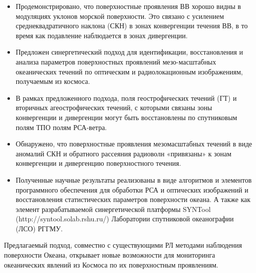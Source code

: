 \begin{itemize}
\item Продемонстрировано, что поверхностные проявления ВВ хорошо видны в модуляциях уклонов морской поверхности. Это связано с усилением среднеквадратичного наклона (СКН) в зонах конвергенции течения ВВ, в то время как подавление наблюдается в зонах дивергенции.

\item Предложен синергетический подход для идентификации, восстановления и анализа параметров поверхностных проявлений мезо-масштабных океанических течений по оптическим и радиолокационным изображениям, получаемым из космоса.

\item В рамках предложенного подхода, поля геострофических течений (ГТ) и вторичных агеострофических течений, с которыми связаны зоны конвергенции и дивергенции могут быть восстановлены по спутниковым полям ТПО полям РСА-ветра. 

\item Обнаружено, что поверхностные проявления мезомасштабных течений в виде аномалий СКН и обратного рассеяния радиоволн «привязаны» к зонам конвергенции и дивергенцию поверхностного течения.

\item Полученные научные результаты реализованы в виде алгоритмов и элементов программного обеспечения для обработки РСА и оптических изображений и восстановления статистических параметров поверхности океана. А также как элемент разрабатываемой синергетической платформы SYNTool (http://syntool.solab.rshu.ru/) Лаборатории спутниковой океанографии (ЛСО) РГГМУ.

\end{itemize}

Предлагаемый подход, совместно с существующими РЛ методами наблюдения поверхности Океана, открывает новые возможности для мониторинга океанических явлений из Космоса по их поверхностным проявлениям.

\clearpage